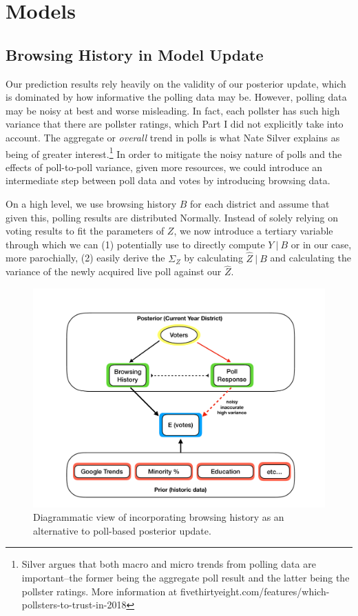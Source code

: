 \documentclass[12pt, letterpaper]{article}
\begin{document}
\section{Models}
\subsection{Browsing History in Model Update}
Our prediction results rely heavily on the validity of our posterior update, which is dominated by how informative the polling data may be. However, polling data may be noisy at best and worse misleading. In fact, each pollster has such high variance that there are pollster ratings, which Part I did not explicitly take into account. The aggregate or \textit{overall} trend in polls is what Nate Silver explains as being of greater interest.\footnote{Silver argues that both macro and micro trends from polling data are important--the former being the aggregate poll result and the latter being the pollster ratings. More information at fivethirtyeight.com/features/which-pollsters-to-trust-in-2018} In order to mitigate the noisy nature of polls and the effects of poll-to-poll variance, given more resources, we could introduce an intermediate step between poll data and votes by introducing browsing data.

On a high level, we use browsing history $B$ for each district and assume that given this, polling results are distributed Normally. Instead of solely relying on voting results to fit the parameters of $Z$, we now introduce a tertiary variable through which we can (1) potentially use to directly compute $Y \ | \ B$ or in our case, more parochially, (2) easily derive the $\Sigma_Z$ by calculating $\hat{Z} \ | \ B$ and calculating the variance of the newly acquired live poll against our $\hat{Z}$.

\begin{figure}[tbh]
  \centering
  \includegraphics[scale=0.4]{browsing_diagram.pdf}
  \caption{Diagrammatic view of incorporating browsing history as an alternative to poll-based posterior update.}
  \label{fig:browsing}
\end{figure}
\end{document}

